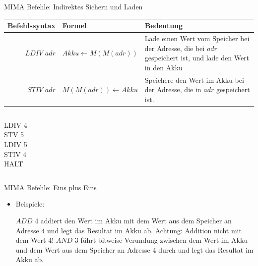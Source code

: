 \documentclass[handout]{beamer}
\begin{document}
\begin{frame}{MIMA Befehle: Indirektes Sichern und Laden}
	\begin{tabular}{r | l p{5cm} }
		Befehlssyntax & Formel & Bedeutung\\\hline\hline 
		$LDIV$ $adr$ & $Akku \leftarrow M(M(adr))$ & Lade einen Wert vom Speicher bei der Adresse, die bei $adr$ gespeichert ist, und lade den Wert in den Akku\\\hline
		$STIV$ $adr$ & $M(M(adr)) \leftarrow Akku$ & Speichere den Wert im Akku bei der Adresse, die in $adr$ gespeichert ist.
	\end{tabular}
	
	\bp 
	\vspace{.5cm}
	\vspace{.2cm}
	
	\begin{columns}
		\begin{column}{0.5\textwidth}
			LDIV 4 \\ STV 5 \\ LDIV 5 \\ STIV 4 \\ HALT
		\end{column}
		
		\begin{column}{0.5\textwidth}
			\begin{memory}
			\end{memory}
		\end{column}
	\end{columns}
\end{frame}

\begin{frame}{MIMA Befehle: Eins plus Eins}
	\begin{itemize}
		\pitem Befehle zu arithmetischen Operationen
		\pitem Eine ALU-Operation, angewandt auf dem Wert des Akkus und dem Wert an gegebener Adresse
		
		\bp
		
		\item Beispiele:
		\begin{itemize}
			\pitem $ADD$ $4$ addiert den Wert im Akku mit dem Wert aus dem Speicher an Adresse $4$ und legt das Resultat im Akku ab\ip . Achtung: Addition nicht mit dem Wert $4$!
			\pitem $AND$ $3$ führt bitweise Verundung zwischen dem Wert im Akku und dem Wert aus dem Speicher an Adresse $4$ durch und legt das Resultat im Akku ab.
		\end{itemize}
	\end{itemize}
\end{frame}
\end{document}
